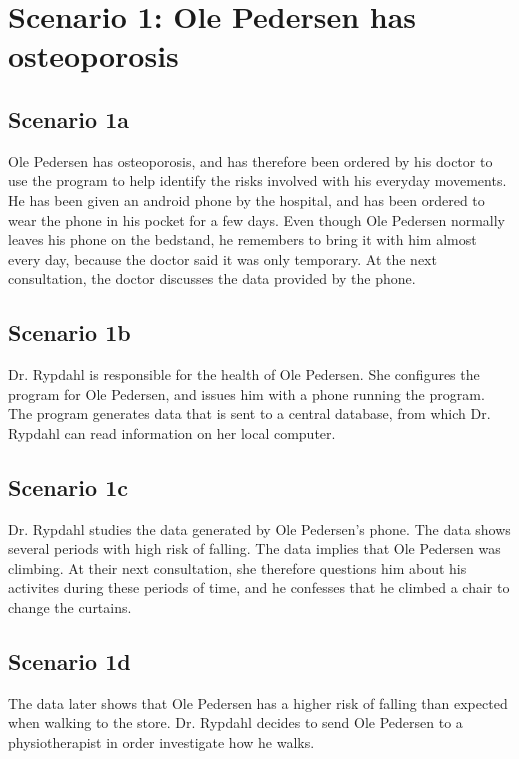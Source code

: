 \section{Scenario 1: Ole Pedersen has osteoporosis}

\subsection*{Scenario 1a}
Ole Pedersen has osteoporosis, and has therefore been ordered by his doctor to use the program to help identify the risks involved with his everyday movements. He has been given an android phone by the hospital, and has been ordered to wear the phone in his pocket for a few days. Even though Ole Pedersen normally leaves his phone on the bedstand, he remembers to bring it with him almost every day, because the doctor said it was only temporary.
	At the next consultation, the doctor discusses the data provided by the phone.
	
	\subsection*{Scenario 1b}

Dr. Rypdahl is responsible for the health of Ole Pedersen. She configures the program for Ole Pedersen, and issues him with a phone running the program. The program generates data that is sent to a central database, from which Dr. Rypdahl can read information on her local computer.

\subsection*{Scenario 1c}

Dr. Rypdahl studies the data generated by Ole Pedersen’s phone. The data shows several periods with high risk of falling. The data implies that Ole Pedersen was climbing. At their next consultation,  she therefore questions him about his activites during these periods of time, and he confesses that he climbed a chair to change the curtains.

\subsection*{Scenario 1d}

The data later shows that Ole Pedersen has a higher risk of falling than expected when walking to the store. Dr. Rypdahl decides to send Ole Pedersen to a physiotherapist in order investigate how he walks.

